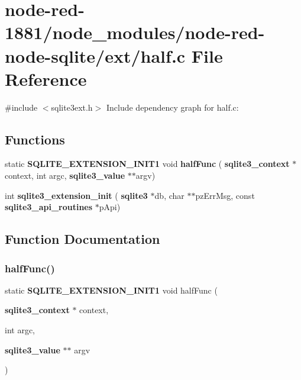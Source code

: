 \section{node-\/red-\/1881/node\+\_\+modules/node-\/red-\/node-\/sqlite/ext/half.c File Reference}
\label{half_8c}
{\ttfamily \#include $<$sqlite3ext.\+h$>$}\newline
Include dependency graph for half.\+c\+:
\subsection*{Functions}
\begin{DoxyCompactItemize}
\item 
static \textbf{ S\+Q\+L\+I\+T\+E\+\_\+\+E\+X\+T\+E\+N\+S\+I\+O\+N\+\_\+\+I\+N\+I\+T1} void \textbf{ half\+Func} (\textbf{ sqlite3\+\_\+context} $\ast$context, int argc, \textbf{ sqlite3\+\_\+value} $\ast$$\ast$argv)
\item 
int \textbf{ sqlite3\+\_\+extension\+\_\+init} (\textbf{ sqlite3} $\ast$db, char $\ast$$\ast$pz\+Err\+Msg, const \textbf{ sqlite3\+\_\+api\+\_\+routines} $\ast$p\+Api)
\end{DoxyCompactItemize}


\subsection{Function Documentation}
\mbox{\label{half_8c_a71c767379b7e99b2f6107b4d8beb4355}} 
\subsubsection{half\+Func()}
{\footnotesize\ttfamily static \textbf{ S\+Q\+L\+I\+T\+E\+\_\+\+E\+X\+T\+E\+N\+S\+I\+O\+N\+\_\+\+I\+N\+I\+T1} void half\+Func (\begin{DoxyParamCaption}\item[{\textbf{ sqlite3\+\_\+context} $\ast$}]{context,  }\item[{int}]{argc,  }\item[{\textbf{ sqlite3\+\_\+value} $\ast$$\ast$}]{argv }\end{DoxyParamCaption})\hspace{0.3cm}{\ttfamily [static]}}



